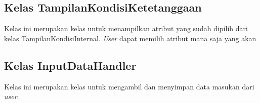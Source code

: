 \subsection{Kelas TampilanKondisiKetetanggaan}
Kelas ini merupakan kelas untuk menampilkan atribut yang sudah dipilih dari kelas TampilanKondisiInternal. \textit{User} dapat memilih atribut mana saja yang akan 
\subsection{Kelas InputDataHandler}
Kelas ini merupakan kelas untuk mengambil dan menyimpan data masukan dari \textit{user}. 
